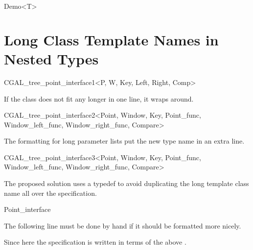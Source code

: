 \documentclass[12pt]{article}
\begin{document}
{\begin{ccClassTemplate}{Demo<T>}
\end{ccClassTemplate}

\section{Long Class Template Names in Nested Types}


\begin{ccClassTemplate}{CGAL_tree_point_interface1<P, W, Key,  
    Left, Right, Comp>}
\end{ccClassTemplate}

If the class does not fit any longer in one line, it wraps around.

\begin{ccClassTemplate}{CGAL_tree_point_interface2<Point, Window, Key,  
         Point_func, Window_left_func, 
         Window_right_func, Compare>}
\end{ccClassTemplate}

The formatting for long parameter lists put the new type name in an extra line.

\begin{ccClassTemplate}{CGAL_tree_point_interface3<Point, Window, Key,  
         Point_func, Window_left_func, 
         Window_right_func, Compare>}
\def\ccLongParamLayout{\ccTrue}
\def\ccLongParamLayout{\ccFalse}
\end{ccClassTemplate}

The proposed solution uses a typedef to avoid duplicating the long
template class name all over the specification.

\begin{ccClass}{Point_interface}
  
The following line must be done by hand if it should be
formatted more nicely.

       
Since here the specification is written in terms of the above
.

\end{ccClass}

}
\end{document}
